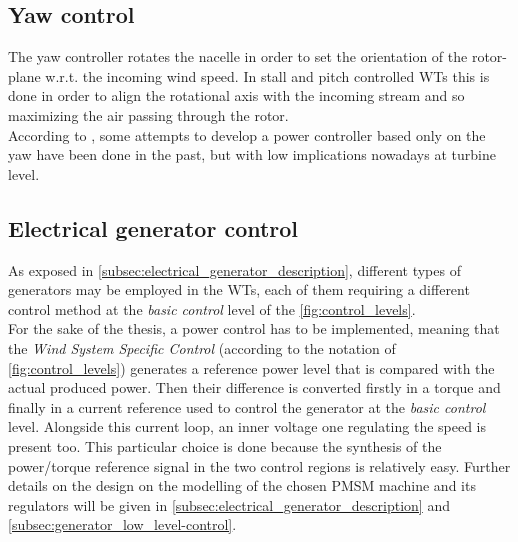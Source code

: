 \subsection{Yaw control}
The yaw controller rotates the nacelle in order to set the orientation of the rotor-plane w.r.t. the incoming wind speed. In stall and pitch controlled \acrshort{WTs} this is done in order to align the rotational axis with the incoming stream and so maximizing the air passing through the rotor. \\
According to \cite{Aerodynamics_of_wind_turbines}, some attempts to develop a power controller based only on the yaw have been done in the past, but with low implications nowadays at turbine level. 

\subsection{Electrical generator control}
As exposed in \autoref{subsec:electrical_generator_description}, different types of generators may be employed in the WTs, each of them requiring a different control method at the \textit{basic control} level of the \autoref{fig:control_levels}. \\
For the sake of the thesis, a power control has to be implemented, meaning that the \textit{Wind System Specific Control} (according to the notation of \autoref{fig:control_levels}) generates a reference power level that is compared with the actual produced power. Then their difference is converted firstly in a torque and finally in a current reference used to control the generator at the \textit{basic control} level. Alongside this current loop, an inner voltage one regulating the speed is present too. This particular choice is done because the synthesis of the power/torque reference signal in the two control regions is relatively easy. Further details on the design on the modelling of the chosen PMSM machine and its regulators will be given in \autoref{subsec:electrical_generator_description} and \autoref{subsec:generator_low_level-control}.